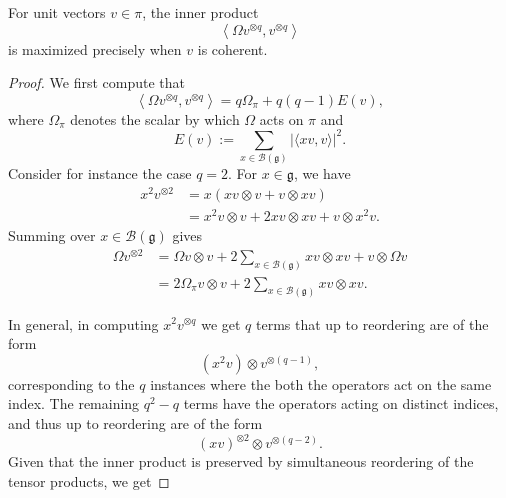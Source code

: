 \documentclass[reqno]{amsart} 
\begin{document}
\begin{lemma}\label{lemma:cngsx4g21h}
  For unit vectors $v \in \pi$, the inner product
  \begin{equation*}
    \left\langle \Omega v^{\otimes q}, v^{\otimes q} \right\rangle
  \end{equation*}
  is maximized precisely when $v$ is coherent.
\end{lemma}
\begin{proof}
  We first compute that
  \begin{equation}\label{eq:cngsx5j54m}
    \left\langle \Omega v^{\otimes q}, v^{\otimes q} \right\rangle
    =
    q
    \Omega_\pi + q(q - 1) E(v),
  \end{equation}
  where $\Omega_\pi$ denotes the scalar by which $\Omega$ acts on $\pi$ and
  \begin{equation*}
    E(v) := \sum_{x \in \mathcal{B}(\mathfrak{g})}
    \left\lvert \langle x v, v \rangle \right\rvert^2.
  \end{equation*}
  Consider for instance the case $q = 2$.  For $x \in \mathfrak{g}$, we have
  \begin{align*}
    x^2 v^{\otimes 2} &= x \left( x v \otimes v +
                        v \otimes x v \right) \\
                      &=
                        x^2 v \otimes v + 2 x v \otimes x v + v \otimes x^2 v.
  \end{align*}
  Summing over $x \in \mathcal{B}(\mathfrak{g})$ gives
  \begin{align*}
    \Omega v^{\otimes 2} &= \Omega v \otimes v + 2 \sum_{x \in \mathcal{B}(\mathfrak{g})} x v \otimes x v+ v \otimes \Omega v  \\
                         &= 2 \Omega_\pi v \otimes v + 2 \sum_{x \in \mathcal{B}(\mathfrak{g})} x v \otimes x v.
  \end{align*}

  In general, in computing $x^{2}v^{\otimes q} $ we get $ q $ terms that up to reordering are of the form
  \begin{equation*}
    (x^{2}v)\otimes v^{\otimes (q-1)},
  \end{equation*}
  corresponding to the $ q $ instances where the both the operators act on the same index. The remaining $ q^{2}-q $ terms have the operators acting on distinct indices, and thus up to reordering are of the form
  \begin{equation*}
    (x v)^{\otimes 2}\otimes v^{\otimes (q-2)} .
  \end{equation*}
  Given that the inner product is preserved by simultaneous reordering of the tensor products, we get


\end{proof}
\end{document}
